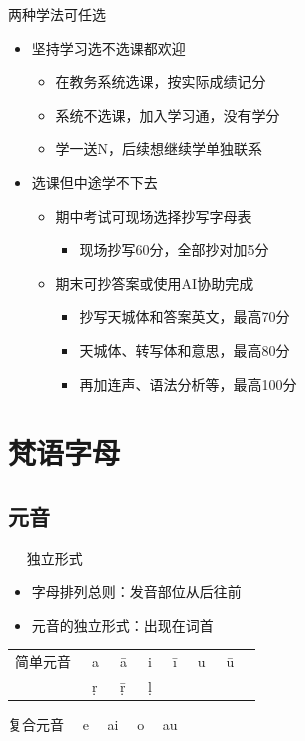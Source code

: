 \documentclass[17pt]{beamer}
\newcommand{\skt}[1]{{\sanskritfont{#1}}} %
\newcommand{\skttrans}[1]{{\skt{#1}~#1}}  %
\begin{document}
\begin{frame}{两种学法可任选}
    \begin{itemize}
    \item 坚持学习选不选课都欢迎
      \begin{itemize}
        \item 在教务系统选课，按实际成绩记分
        \item 系统不选课，加入学习通，没有学分
        \item 学一送N，后续想继续学单独联系
      \end{itemize}

    \item 选课但中途学不下去
    \begin{itemize}
      \item 期中考试可现场选择抄写字母表
      \begin{itemize}
        \item 现场抄写60分，全部抄对加5分
      \end{itemize}
      \item 期末可抄答案或使用AI协助完成
      \begin{itemize}
        \item 抄写天城体和答案英文，最高70分
        \item 天城体、转写体和意思，最高80分
        \item 再加连声、语法分析等，最高100分
      \end{itemize}
    \end{itemize}
  \end{itemize}
\end{frame}

\section{梵语字母}
\begin{frame}{\insertsection }
    \tableofcontents[currentsection]
\end{frame}

\subsection{元音}

\begin{frame}{\insertsubsection ~~ 独立形式}
  \begin{itemize}
    \item
      字母排列总则：发音部位从后往前
    \item
      元音的独立形式：出现在词首
  \end{itemize}
  \bigskip

    \begin{tabular}{@{}llllllll@{}} %
      简单元音 & \skttrans{a} & \skttrans{ā} & \skttrans{i} & \skttrans{ī} & \skttrans{u} & \skttrans{ū} \\
       & \skttrans{ṛ} & \skttrans{ṝ} & \skttrans{ḷ} & & & \\
    \end{tabular}

    复合元音 ~\skttrans{e} ~\skttrans{ai} ~\skttrans{o} ~\skttrans{au}
\end{frame}
\end{document}
